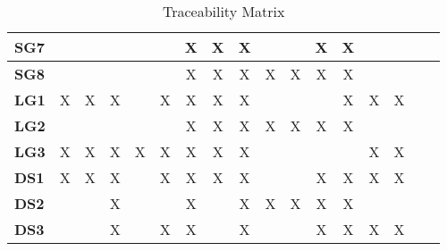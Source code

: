 \documentclass[12pt]{article}
\begin{document}
\begin{table}[H]
\begin{adjustwidth}{-0.1in}{-1in}
{\begin{tabular}{c|c|c|c|c|c|c|c|c|c|c|c|c|c|c|c|c|}
\multicolumn{1}{|l|}{\textbf{SG7}}   &              &              &              &              &              &      X       &       X      &       X      &              &              &       X      &       X      &              &              &              &               \\ \hline
\multicolumn{1}{|l|}{\textbf{SG8}}   &              &              &              &              &              &      X       &       X      &       X      &       X      &       X      &       X      &       X      &              &              &              &               \\ \hline
\multicolumn{1}{|l|}{\textbf{LG1}}   &      X       &      X       &       X      &              &       X      &      X       &       X      &       X      &              &              &              &       X      &       X      &       X      &              &               \\ \hline
\multicolumn{1}{|l|}{\textbf{LG2}}   &              &              &              &              &              &      X       &       X      &       X      &       X      &       X      &       X      &       X      &              &              &              &               \\ \hline
\multicolumn{1}{|l|}{\textbf{LG3}}   &      X       &      X       &       X      &       X      &       X      &      X       &       X      &       X      &              &              &              &              &       X      &       X      &              &               \\ \hline
\multicolumn{1}{|l|}{\textbf{DS1}}   &      X       &      X       &       X      &              &       X      &      X       &       X      &       X      &              &              &       X      &       X      &       X      &       X      &              &               \\ \hline
\multicolumn{1}{|l|}{\textbf{DS2}}   &              &              &       X      &              &              &      X       &              &       X      &       X      &       X      &       X      &       X      &              &              &              &               \\ \hline
\multicolumn{1}{|l|}{\textbf{DS3}}   &              &              &       X      &              &       X      &      X       &              &       X      &              &              &       X      &       X      &       X      &       X      &              &               \\ \hline

\end{tabular}

}
\caption{Traceability Matrix}
    \label{tab:matrix1}
\end{adjustwidth}
\end{table}
\end{document}
